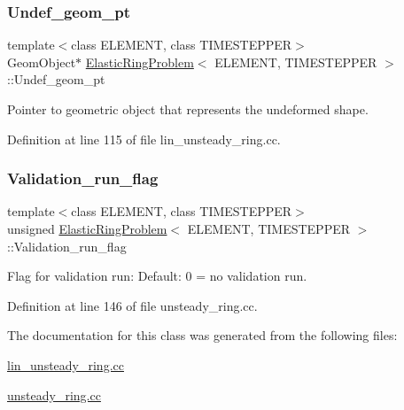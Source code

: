 \subsubsection{\texorpdfstring{Undef\+\_\+geom\+\_\+pt}{Undef\_geom\_pt}}
{\footnotesize\ttfamily template$<$class E\+L\+E\+M\+E\+NT, class T\+I\+M\+E\+S\+T\+E\+P\+P\+ER$>$ \\
Geom\+Object$\ast$ \hyperlink{classElasticRingProblem}{Elastic\+Ring\+Problem}$<$ E\+L\+E\+M\+E\+NT, T\+I\+M\+E\+S\+T\+E\+P\+P\+ER $>$\+::Undef\+\_\+geom\+\_\+pt\hspace{0.3cm}{\ttfamily [private]}}



Pointer to geometric object that represents the undeformed shape. 



Definition at line 115 of file lin\+\_\+unsteady\+\_\+ring.\+cc.

\mbox{\label{classElasticRingProblem_a16c967c1a9fbb26b9e640651883e59d8}} 
\subsubsection{\texorpdfstring{Validation\+\_\+run\+\_\+flag}{Validation\_run\_flag}}
{\footnotesize\ttfamily template$<$class E\+L\+E\+M\+E\+NT, class T\+I\+M\+E\+S\+T\+E\+P\+P\+ER$>$ \\
unsigned \hyperlink{classElasticRingProblem}{Elastic\+Ring\+Problem}$<$ E\+L\+E\+M\+E\+NT, T\+I\+M\+E\+S\+T\+E\+P\+P\+ER $>$\+::Validation\+\_\+run\+\_\+flag\hspace{0.3cm}{\ttfamily [private]}}



Flag for validation run\+: Default\+: 0 = no validation run. 



Definition at line 146 of file unsteady\+\_\+ring.\+cc.



The documentation for this class was generated from the following files\+:\begin{DoxyCompactItemize}
\item 
\hyperlink{lin__unsteady__ring_8cc}{lin\+\_\+unsteady\+\_\+ring.\+cc}\item 
\hyperlink{unsteady__ring_8cc}{unsteady\+\_\+ring.\+cc}\end{DoxyCompactItemize}

